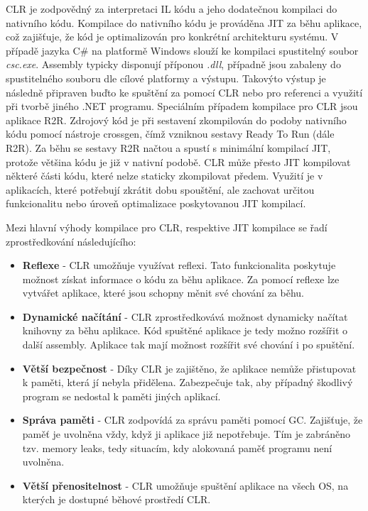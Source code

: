 
CLR je zodpovědný za interpretaci IL kódu a jeho dodatečnou kompilaci do nativního kódu. Kompilace do nativního kódu je prováděna JIT za běhu aplikace, což zajišťuje, že kód je optimalizován pro konkrétní architekturu systému. V případě jazyka C\# na platformě Windows slouží ke kompilaci spustitelný soubor \emph{csc.exe}. Assembly typicky disponují příponou \emph{.dll}, případně jsou zabaleny do spustitelného souboru dle cílové platformy a výstupu. Takovýto výstup je následně připraven buďto ke spuštění za pomocí CLR nebo pro referenci a využití při tvorbě jiného .NET programu. \cite{Richter2012} Speciálním případem kompilace pro CLR jsou aplikace R2R. Zdrojový kód je při sestavení zkompilován do podoby nativního kódu pomocí nástroje crossgen, čímž vzniknou sestavy Ready To Run (dále R2R). Za běhu se sestavy R2R načtou a spustí s minimální kompilací JIT, protože většina kódu je již v nativní podobě. CLR může přesto JIT kompilovat některé části kódu, které nelze staticky zkompilovat předem. \cite{netdocsr2r} Využití je v aplikacích, které potřebují zkrátit dobu spouštění, ale zachovat určitou funkcionalitu nebo úroveň optimalizace poskytovanou JIT kompilací.

Mezi hlavní výhody kompilace pro CLR, respektive JIT kompilace se řadí zprostředkování následujícího:

\begin{itemize}
    \item  \textbf{Reflexe} - CLR umožňuje využívat reflexi. Tato funkcionalita poskytuje možnost získat informace o kódu za běhu aplikace. Za pomocí reflexe lze vytvářet aplikace, které jsou schopny měnit své chování za běhu.
    \item \textbf{Dynamické načítání} - CLR zprostředkovává možnost dynamicky načítat knihovny za běhu aplikace. Kód spuštěné aplikace je tedy možno rozšířit o další assembly. Aplikace tak mají možnost rozšířit své chování i po spuštění.
    \item \textbf{Větší bezpečnost} - Díky CLR je zajištěno, že aplikace nemůže přistupovat k paměti, která jí nebyla přidělena. Zabezpečuje tak, aby případný škodlivý program se nedostal k paměti jiných aplikací.
    \item \textbf{Správa paměti} - CLR zodpovídá za správu paměti pomocí GC. Zajišťuje, že paměť je uvolněna vždy, když ji aplikace již nepotřebuje. Tím je zabráněno tzv. memory leaks, tedy situacím, kdy alokovaná paměť programu není uvolněna.
    \item \textbf{Větší přenositelnost} - CLR umožňuje spuštění aplikace na všech OS, na kterých je dostupné běhové prostředí CLR.
\end{itemize}


